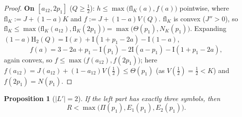 \documentclass[journal]{IEEEtran}
\newtheorem{proposition}{Proposition}
\theoremstyle{definition}
\newcommand{\Hh}{\mathrm H_2}
\begin{document}
\begin{proof}
\textbf{On $[a_{12},2p_1]$} ($Q\ge\tfrac12$):
$h\le\max\bigl(\mathrm{fl}_K(a),f(a)\bigr)$ pointwise, where
$\mathrm{fl}_K:=J+(1-a)K$ and $f:=J+(1-a)V(Q)$. $\mathrm{fl}_K$ is convex
($J''>0$), so
$\mathrm{fl}_K\le\max\bigl(\mathrm{fl}_K(a_{12}),\mathrm{fl}_K(2p_1)\bigr)
=\max\bigl(\Theta(p_1),N_K(p_1)\bigr)$. Expanding
$(1-a)\Hh(Q)=\mathrm I(x)+\mathrm I(1+p_1-2a)-\mathrm I(1-a)$,
\[
  f(a)=3-2a+p_1-\mathrm I(p_1)-2\mathrm I(a-p_1)-\mathrm I(1+p_1-2a),
\]
again convex, so $f\le\max\bigl(f(a_{12}),f(2p_1)\bigr)$; here
$f(a_{12})=J(a_{12})+(1-a_{12})V(\tfrac12)\le\Theta(p_1)$ \textup{(}as
$V(\tfrac12)=\tfrac12<K$\textup{)} and $f(2p_1)=N(p_1)$.
\end{proof}

\begin{proposition}[$|L'|=2$]\label{prop:L2-q}
If the left part has exactly three symbols, then
\[
  R<\max\bigl(\Pi(p_1),E_1(p_1),E_2(p_1)\bigr).
\]
\end{proposition}
\end{document}
